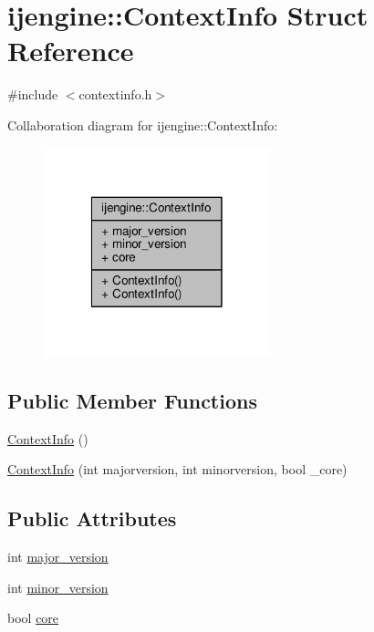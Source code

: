 \hypertarget{structijengine_1_1ContextInfo}{\section{ijengine\-:\-:Context\-Info Struct Reference}
\label{structijengine_1_1ContextInfo}
}


{\ttfamily \#include $<$contextinfo.\-h$>$}



Collaboration diagram for ijengine\-:\-:Context\-Info\-:\nopagebreak
\begin{figure}[H]
\begin{center}
\leavevmode
\includegraphics[width=186pt]{structijengine_1_1ContextInfo__coll__graph}
\end{center}
\end{figure}
\subsection*{Public Member Functions}
\begin{DoxyCompactItemize}
\item 
\hyperlink{structijengine_1_1ContextInfo_a82768f50efbf3d056282baffcbff66bd}{Context\-Info} ()
\item 
\hyperlink{structijengine_1_1ContextInfo_a7d8de4f7da93da958f06a1ef342f2c4c}{Context\-Info} (int majorversion, int minorversion, bool \-\_\-core)
\end{DoxyCompactItemize}
\subsection*{Public Attributes}
\begin{DoxyCompactItemize}
\item 
int \hyperlink{structijengine_1_1ContextInfo_a44c279f6a92cc71d0646efc13f20b925}{major\-\_\-version}
\item 
int \hyperlink{structijengine_1_1ContextInfo_a9027633774ff617b758c3be0ad456933}{minor\-\_\-version}
\item 
bool \hyperlink{structijengine_1_1ContextInfo_ae94af83cb75cdf9565ad810819d25351}{core}
\end{DoxyCompactItemize}


